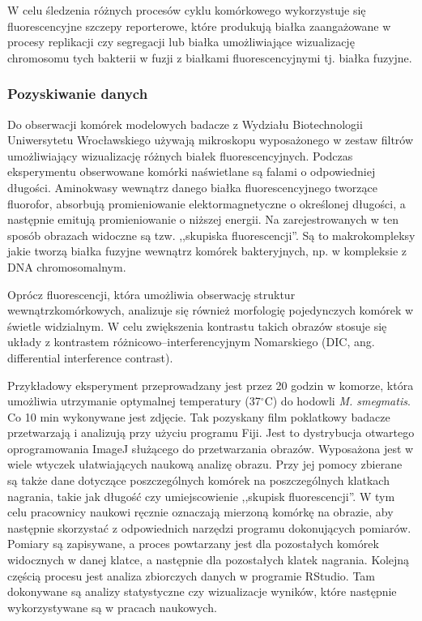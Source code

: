 \documentclass[declaration,shortabstract,mgr]{iithesis}
\begin{document}
W celu śledzenia różnych procesów cyklu komórkowego wykorzystuje się fluorescencyjne szczepy reporterowe, które produkują białka zaangażowane w procesy replikacji czy segregacji lub białka umożliwiające wizualizację chromosomu tych bakterii w fuzji z białkami fluorescencyjnymi tj. białka fuzyjne.

\subsubsection{Pozyskiwanie danych}

Do obserwacji komórek modelowych badacze z Wydziału Biotechnologii Uniwersytetu Wrocławskiego używają mikroskopu wyposażonego w zestaw filtrów umożliwiający wizualizację różnych białek fluorescencyjnych.
Podczas eksperymentu obserwowane komórki naświetlane są falami o odpowiedniej długości.
Aminokwasy wewnątrz danego białka fluorescencyjnego tworzące fluorofor, absorbują promieniowanie elektormagnetyczne o określonej długości, a następnie emitują promieniowanie o niższej energii.
Na zarejestrowanych w ten sposób obrazach widoczne są tzw. ,,skupiska fluorescencji''.
Są to makrokompleksy jakie tworzą białka fuzyjne wewnątrz komórek bakteryjnych, np. w kompleksie z DNA chromosomalnym.

Oprócz fluorescencji, która umożliwia obserwację struktur wewnątrzkomórkowych, analizuje się również morfologię pojedynczych komórek w świetle widzialnym. 
W celu zwiększenia kontrastu takich obrazów stosuje się układy z kontrastem różnicowo--interferencyjnym Nomarskiego\cite{paper:dic} (DIC, ang. differential interference contrast).

Przykładowy eksperyment przeprowadzany jest przez 20 godzin w komorze, która umożliwia utrzymanie optymalnej temperatury (37$^{\circ}$C) do hodowli \emph{M. smegmatis}.
Co 10 min wykonywane jest zdjęcie.
Tak pozyskany film poklatkowy badacze przetwarzają i analizują przy użyciu programu Fiji\cite{imagej:fiji}.
Jest to dystrybucja otwartego oprogramowania ImageJ służącego do przetwarzania obrazów.
Wyposażona jest w wiele wtyczek ułatwiających naukową analizę obrazu.
Przy jej pomocy zbierane są także dane dotyczące poszczególnych komórek na poszczególnych klatkach nagrania, takie jak długość czy umiejscowienie ,,skupisk fluorescencji''.
W tym celu pracownicy naukowi ręcznie oznaczają mierzoną komórkę na obrazie, aby następnie skorzystać z odpowiednich narzędzi programu dokonujących pomiarów.
Pomiary są zapisywane, a proces powtarzany jest dla pozostałych komórek widocznych w danej klatce, a następnie dla pozostałych klatek nagrania.
Kolejną częścią procesu jest analiza zbiorczych danych w programie RStudio\cite{app:rstudio}.
Tam dokonywane są analizy statystyczne czy wizualizacje wyników, które następnie wykorzystywane są w pracach naukowych.
\end{document}
